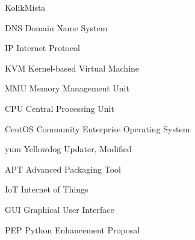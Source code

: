 \begin{seznamzkratek}{KolikMista}

		{DNS}
		{Domain Name System}
		
		{IP}
		{Internet Protocol}
		
		{KVM}
		{Kernel-based Virtual Machine}
		
		{MMU}
		{Memory Management Unit}
		
		{CPU}
		{Central Processing Unit}
		
		{CentOS}
		{Community Enterprise Operating System}


		{yum}
		{Yellowdog Updater, Modified}

		{APT}
		{Advanced Packaging Tool}
		
		{IoT}
		{Internet of Things}

		{GUI}
		{Graphical User Interface}
		
		{PEP}
		{Python Enhancement Proposal}		

\end{seznamzkratek}
